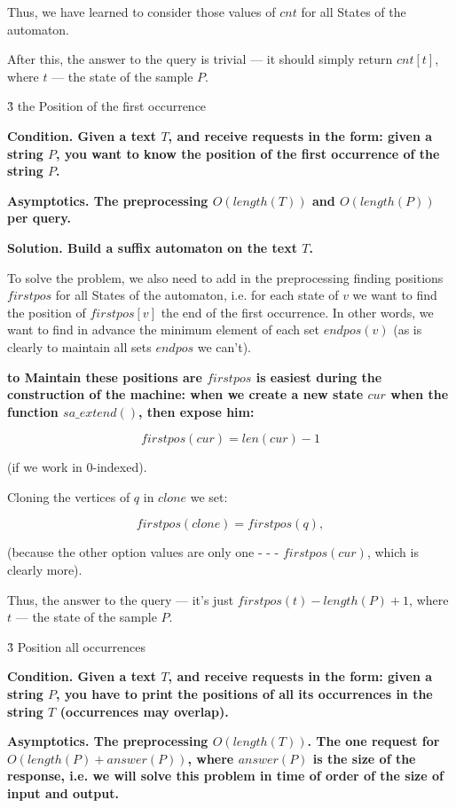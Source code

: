 Thus, we have learned to consider those values of $cnt$ for all States of the automaton.

After this, the answer to the query is trivial --- it should simply return $cnt[t]$, where $t$ --- the state of the sample $P$.


\h3{ the Position of the first occurrence }

\bf{Condition}. Given a text $T$, and receive requests in the form: given a string $P$, you want to know the position of the first occurrence of the string $P$.

\bf{Asymptotics}. The preprocessing $O (length (T))$ and $O (length (P))$ per query.

\bf{Solution}. Build a suffix automaton on the text $T$.

To solve the problem, we also need to add in the preprocessing finding positions $firstpos$ for all States of the automaton, i.e. for each state of $v$ we want to find the position of $firstpos[v]$ the end of the first occurrence. In other words, we want to find in advance the minimum element of each set $endpos(v)$ (as is clearly to maintain all sets $endpos$ we can't).

\bf{to Maintain} these positions are $firstpos$ is easiest during the construction of the machine: when we create a new state $cur$ when the function $sa\_extend()$, then expose him:

$$ firstpos(cur) = len(cur) - 1 $$

(if we work in $0$-indexed).

Cloning the vertices of $q$ in $clone$ we set:

$$ firstpos(clone) = firstpos(q), $$

(because the other option values are only one - - - $firstpos(cur)$, which is clearly more).

Thus, the answer to the query --- it's just $firstpos(t)-length(P)+1$, where $t$ --- the state of the sample $P$.


\h3{ Position all occurrences }

\bf{Condition}. Given a text $T$, and receive requests in the form: given a string $P$, you have to print the positions of all its occurrences in the string $T$ (occurrences may overlap).

\bf{Asymptotics}. The preprocessing $O (length (T))$. The one request for $O (length (P) + answer (P))$, where $answer(P)$ is the size of the response, i.e. we will solve this problem in time of order of the size of input and output.

